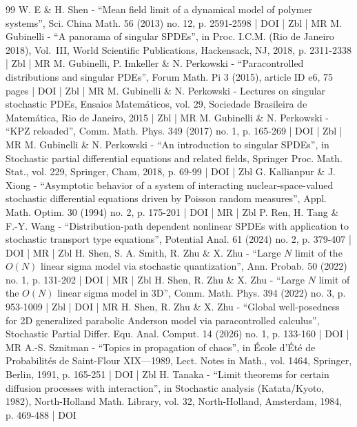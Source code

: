 \documentclass[10pt]{amsart}
\theoremstyle{definition}
\begin{document}
\begin{thebibliography}{99}
W. E \& H. Shen - “Mean field limit of a dynamical model of polymer systems”, Sci. China Math. 56 (2013) no. 12, p. 2591-2598 | DOI | Zbl | MR
M. Gubinelli - “A panorama of singular SPDEs”, in Proc. I.C.M. (Rio de Janeiro 2018), Vol. III, World Scientific Publications, Hackensack, NJ, 2018, p. 2311-2338 | Zbl | MR
M. Gubinelli, P. Imkeller \& N. Perkowski - “Paracontrolled distributions and singular PDEs”, Forum Math. Pi 3 (2015), article ID e6, 75 pages | DOI | Zbl | MR
M. Gubinelli \& N. Perkowski - Lectures on singular stochastic PDEs, Ensaios Matemáticos, vol. 29, Sociedade Brasileira de Matemática, Rio de Janeiro, 2015 | Zbl | MR
M. Gubinelli \& N. Perkowski - “KPZ reloaded”, Comm. Math. Phys. 349 (2017) no. 1, p. 165-269 | DOI | Zbl | MR
M. Gubinelli \& N. Perkowski - “An introduction to singular SPDEs”, in Stochastic partial differential equations and related fields, Springer Proc. Math. Stat., vol. 229, Springer, Cham, 2018, p. 69-99 | DOI | Zbl
G. Kallianpur \& J. Xiong - “Asymptotic behavior of a system of interacting nuclear-space-valued stochastic differential equations driven by Poisson random measures”, Appl. Math. Optim. 30 (1994) no. 2, p. 175-201 | DOI | MR | Zbl
P. Ren, H. Tang \& F.-Y. Wang - “Distribution-path dependent nonlinear SPDEs with application to stochastic transport type equations”, Potential Anal. 61 (2024) no. 2, p. 379-407 | DOI | MR | Zbl
H. Shen, S. A. Smith, R. Zhu \& X. Zhu - “Large $N$ limit of the $O(N)$ linear sigma model via stochastic quantization”, Ann. Probab. 50 (2022) no. 1, p. 131-202 | DOI | MR | Zbl
H. Shen, R. Zhu \& X. Zhu - “Large $N$ limit of the $O(N)$ linear sigma model in 3D”, Comm. Math. Phys. 394 (2022) no. 3, p. 953-1009 | Zbl | DOI | MR
H. Shen, R. Zhu \& X. Zhu - “Global well-posedness for 2D generalized parabolic Anderson model via paracontrolled calculus”, Stochastic Partial Differ. Equ. Anal. Comput. 14 (2026) no. 1, p. 133-160 | DOI | MR
A.-S. Sznitman - “Topics in propagation of chaos”, in École d’Été de Probabilités de Saint-Flour XIX—1989, Lect. Notes in Math., vol. 1464, Springer, Berlin, 1991, p. 165-251 | DOI | Zbl
H. Tanaka - “Limit theorems for certain diffusion processes with interaction”, in Stochastic analysis (Katata/Kyoto, 1982), North-Holland Math. Library, vol. 32, North-Holland, Amsterdam, 1984, p. 469-488 | DOI
\end{thebibliography}
\end{document}
